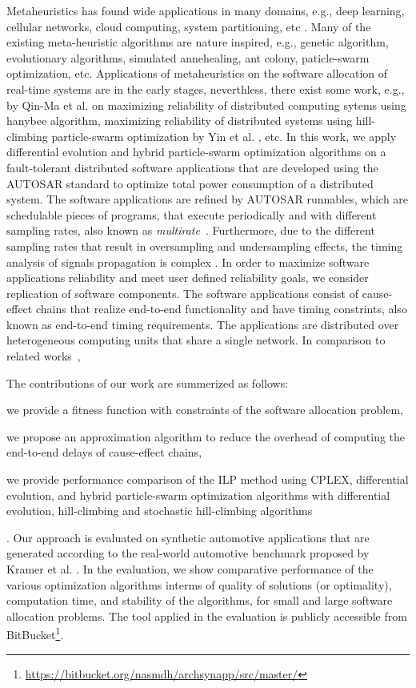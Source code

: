 Metaheuristics has found wide applications in many domains, e.g.,  deep learning, cellular networks, cloud computing, system partitioning, etc \cite{bibid}. Many of the existing meta-heuristic algorithms are nature inspired, e.g., genetic algorithm, evolutionary algorithms, simulated annehealing, ant colony, paticle-swarm optimization, etc. Applications of metaheuristics on the software allocation of real-time systems are in the early stages, neverthless, there exist some work, e.g., by Qin-Ma et al. \cite{bibid} on maximizing reliability of distributed computing sytems using hanybee algorithm, maximizing reliability of distributed systems using hill-climbing particle-swarm optimization by Yin et al. \cite{yin2007task}, etc. In this work, we apply differential evolution and hybrid particle-swarm optimization algorithms on a fault-tolerant distributed software applications that are developed using the AUTOSAR standard to optimize total power consumption of a distributed system. The software applications are refined by AUTOSAR runnables, which are schedulable pieces of programs, that execute periodically and with different sampling rates, also known as \textit{multirate}~\cite{Vinet2010APolynomials}. Furthermore, due to the different sampling rates that result in oversampling and undersampling effects, the timing analysis of signals propagation is complex \cite{mubeen2013support}. In order to maximize software applications reliability and meet user defined reliability goals, we consider replication of software components. The software applications consist of cause-effect chains that realize end-to-end functionality and have timing constrints, also known as end-to-end timing requirements. The applications are distributed over heterogeneous computing units that share a single network. In comparison to related works~\cite{Wozniak2013AnArchitectures, vsvogor2014extended,Saidi2015AnArchitectures}, 

The contributions of our work are summerized as follows: 
\begin{enumerate*}[label=(\roman*)]
	\item we provide a fitness function with constraints of the software allocation problem,
	\item we propose an approximation algorithm to reduce the overhead of computing the end-to-end delays of cause-effect chains,
	\item we provide performance comparison of the ILP method using CPLEX, differential evolution, and hybrid particle-swarm optimization algorithms with differential evolution, hill-climbing and stochastic hill-climbing algorithms
\end{enumerate*}. Our approach is evaluated on synthetic automotive applications that are generated according to the real-world automotive benchmark proposed by Kramer et al. \cite{Kramer2015RealFree}. In the evaluation, we show comparative performance of the various optimization algorithms interms of quality of solutions (or optimality), computation time,  and stability of the algorithms, for small and large software allocation problems. The tool applied in the evaluation is publicly accessible from BitBucket\footnote{\url{https://bitbucket.org/nasmdh/archsynapp/src/master/}}. 

